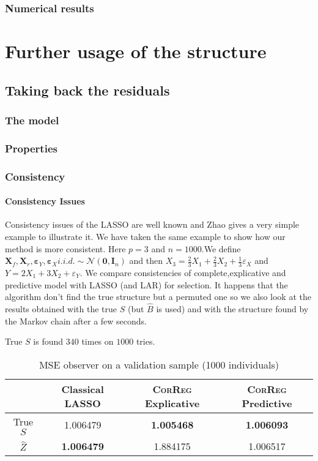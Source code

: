\documentclass[11pt,a4paper]{report}
\begin{document}
	\section{Numerical results}
\part{Further usage of the structure}	
\chapter{Taking back the residuals}
	\section{The model}
	\section{Properties}
	\section{Consistency}
		\subsection{Consistency Issues}\label{consistency}
		Consistency issues of the LASSO are well known and Zhao \cite{Zhao2006MSC} gives a very simple example to illustrate it.
		We have taken the same example to show how our method is more consistent.
		Here $p=3$ and $n=1000$.We define $\boldsymbol{X}_f,\boldsymbol{X}_r,\boldsymbol{\varepsilon}_Y,\boldsymbol{\varepsilon}_{X} i.i.d. \sim \mathcal{N}(\boldsymbol{0},\boldsymbol{I}_n)$ and then $X_3=\frac{2}{3}X_1+\frac{2}{3}X_2+\frac{1}{3}\varepsilon_X$ and $Y=2X_1+3X_2+\varepsilon_Y$.
		We compare consistencies of complete,explicative and predictive model with LASSO (and LAR) for selection.
		It happens that the algorithm don't find the true structure but a permuted one so we also look at the results obtained with the true $S$ (but $\hat{B}$ is used) and with the structure found by the Markov chain after a few seconds.
		
		True $S$ is found $340$ times on $1000$ tries.
		
		\begin{table}[h!]
		\centering
		\begin{tabular}{|c|c|c|c|}
		\hline 
		 & Classical LASSO & \textsc{CorReg} Explicative & \textsc{CorReg} Predictive \\ 
		\hline 
		True $S$ &  1.006479 & \textbf{1.005468} & \textbf{1.006093} \\ 
		\hline 
		$\hat{Z}$ & \textbf{1.006479} & 1.884175 & 1.006517 \\ 
		\hline 
		\end{tabular} 
		\caption{MSE observer on a validation sample (1000 individuals)}
		\end{table}
\end{document}
